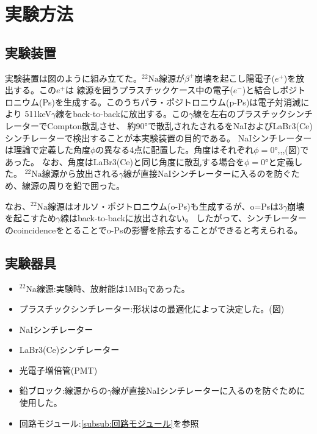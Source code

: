 \documentclass[a4paper,10pt,dvipdfmx,titlepage]{jsarticle}
\numberwithin{equation}{section}
\begin{document}
\section{実験方法}

\subsection{実験装置}
実験装置は図のように組み立てた。$^{22}\text{Na}$線源が$\beta^{+}$崩壊を起こし陽電子($e^{+}$)を放出する。この$e^{+}$は
線源を囲うプラスチックケース中の電子($e^{-}$)と結合しポジトロニウム(Ps)を生成する。このうちパラ・ポジトロニウム(p-Ps)は電子対消滅により
511keV$\gamma$線をback-to-backに放出する。この$\gamma$線を左右のプラスチックシンチレーターでCompton散乱させ、
約90°で散乱されたされるをNaIおよびLaBr3(Ce)シンチレーターで検出することが本実験装置の目的である。
NaIシンチレーターは理論で定義した角度$\phi$の異なる4点に配置した。角度はそれぞれ$\phi=$0°,,,(図)であった。
なお、角度はLaBr3(Ce)と同じ角度に散乱する場合を$\phi=$0°と定義した。
$^{22}\text{Na}$線源から放出される$\gamma$線が直接NaIシンチレーターに入るのを防ぐため、線源の周りを鉛で囲った。


なお、$^{22}\text{Na}$線源はオルソ・ポジトロニウム(o-Ps)も生成するが、o=Psは3$\gamma$崩壊を起こすため$\gamma$線はback-to-backに放出されない。
したがって、シンチレーターのcoincidenceをとることでo-Psの影響を除去することができると考えられる。


\subsection{実験器具}
\begin{itemize}
\item $^{22}\text{Na}$線源:実験時、放射能は1MBqであった。
\item プラスチックシンチレーター:形状はの最適化によって決定した。(図)
\item NaIシンチレーター
\item LaBr3(Ce)シンチレーター
\item 光電子増倍管(PMT)
\item 鉛ブロック:線源からの$\gamma$線が直接NaIシンチレーターに入るのを防ぐために使用した。
\item 回路モジュール:\ref{subsub:回路モジュール}を参照

\end{itemize}
\end{document}
